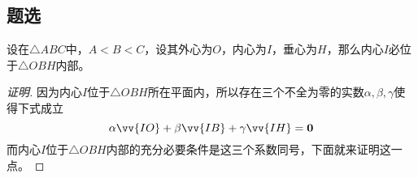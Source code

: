 \subsection{题选}
\label{sec:exercise-for-triangle}

\begin{exercise}
  设在$\triangle{ABC}$中，$A<B<C$，设其外心为$O$，内心为$I$，垂心为$H$，那么内心$I$必位于$\triangle{OBH}$内部。
\end{exercise}

\exerciseFrom[\url{http://kuing.orzweb.net/viewthread.php?tid=4973}]

\exerciseSolvedDate[2017-11-03]

\begin{proof}[证明]
 因为内心$I$位于$\triangle{OBH}$所在平面内，所以存在三个不全为零的实数$\alpha,\beta,\gamma$使得下式成立
\[ \alpha \vv{IO} + \beta \vv{IB} + \gamma \vv{IH} = \bm{0} \]
而内心$I$位于$\triangle{OBH}$内部的充分必要条件是这三个系数同号，下面就来证明这一点。


\end{proof}

